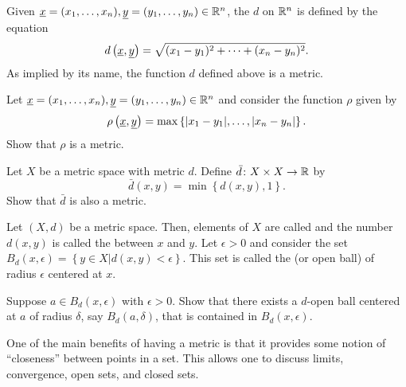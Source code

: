 \begin{example}
Given $\underline{x} = (x_1, \ldots, x_n), \underline{y} = (y_1, \ldots, y_n) \in \mathbb{R}^n$, the  $d$ on $\mathbb{R}^n$ is defined by the equation
\begin{equation*}
d \left( \underline{x}, \underline{y} \right)
= \sqrt{ (x_1 - y_1)^2 + \cdots + (x_n - y_n)^2 }.
\end{equation*}
As implied by its name, the function $d$ defined above is a metric.
\end{example}

\begin{problem}
Let $\underline{x} = (x_1, \ldots, x_n), \underline{y} = (y_1, \ldots, y_n) \in \mathbb{R}^n$ and consider the function $\rho$ given by
\begin{equation*}
\rho \left( \underline{x}, \underline{y} \right)
= \max \left\{ |x_1 - y_1|, \ldots, |x_n - y_n| \right\}.
\end{equation*}
Show that $\rho$ is a metric.
\end{problem}

\begin{problem} \label{problem:StandardBoundedMetric}
Let $X$ be a metric space with metric $d$.
Define $\bar{d}  \colon X \times X \rightarrow \mathbb{R}$ by
\begin{equation*}
\bar{d} (x, y)
= \min \left\{ d (x, y), 1 \right\}.
\end{equation*}
Show that $\bar{d}$ is also a metric.
\end{problem}

Let $(X,d)$ be a metric space.
Then, elements of $X$ are called  and the number $d(x,y)$ is called the  between $x$ and $y$.
Let $\epsilon > 0$ and consider the set $B_d(x,\epsilon) = \left\{ y \in X | d(x,y) < \epsilon \right\}$.
This set is called the  (or open ball) of radius $\epsilon$ centered at $x$.

\begin{problem}
Suppose $a \in B_d(x, \epsilon)$ with $\epsilon > 0$.
Show that there exists a $d$-open ball centered at $a$ of radius $\delta$, say $B_d(a, \delta)$, that is contained in $B_d(x, \epsilon)$.
\end{problem}

One of the main benefits of having a metric is that it provides some notion of ``closeness'' between points in a set.
This allows one to discuss limits, convergence, open sets, and closed sets.

